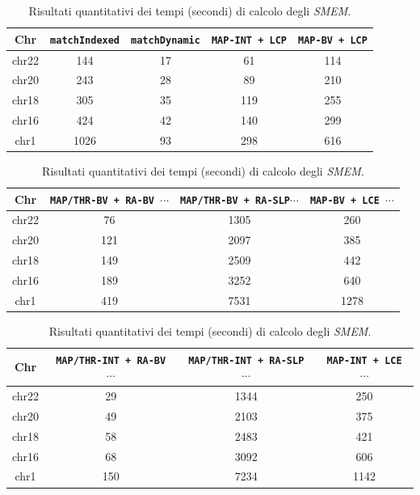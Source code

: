  

\begin{table}
  \centering
  \caption{Risultati quantitativi dei tempi (secondi) di calcolo degli
    \textit{SMEM}.}  
  \label{tab:exetime}
  \footnotesize
  \begin{tabular}{c||c|c|c|c} 
    \textbf{Chr}
    & \textbf{\texttt{matchIndexed}}
    & \textbf{\texttt{matchDynamic}}
    & \textbf{\texttt{MAP-INT \newline+ LCP}}
    & \textbf{\texttt{MAP-BV \newline+ LCP}}\\
    \hline
    \hline
    chr22 & 144 & 17 & 61 & 114 \\
    chr20 & 243 & 28 & 89 & 210 \\
    chr18 & 305 & 35 & 119 & 255 \\
    chr16 & 424 & 42 & 140 & 299 \\
    chr1 & 1026 & 93 & 298 & 616
  \end{tabular}
  \vspace{+3mm}
  \vspace{+1mm}
  \begin{tabular}{c||c|c|c} 
    \textbf{Chr}
    & \textbf{\texttt{MAP/THR-BV + RA-BV $\cdots$}}
    & \textbf{\texttt{MAP/THR-BV + RA-SLP$\cdots$}}
    & \textbf{\texttt{MAP-BV + LCE $\cdots$}}\\
    \hline
    \hline
    chr22 & 76 & 1305 & 260 \\
    chr20 & 121 & 2097 & 385  \\
    chr18 & 149 & 2509 & 442  \\
    chr16 & 189 & 3252 & 640 \\
    chr1 & 419 & 7531 & 1278 
  \end{tabular}
  \vspace{+3mm}
  \vspace{+1mm}
  \begin{tabular}{c||c|c|c} 
    \textbf{Chr}
    & \textbf{\texttt{MAP/THR-INT + RA-BV $\cdots$}}
    & \textbf{\texttt{MAP/THR-INT + RA-SLP $\cdots$}}
    & \textbf{\texttt{MAP-INT + LCE $\cdots$}}\\
    \hline
    \hline
    chr22 & 29 & 1344 & 250 \\
    chr20 & 49 & 2103 & 375 \\
    chr18 & 58 & 2483 & 421 \\
    chr16 & 68 & 3092 & 606 \\
    chr1 & 150 & 7234 & 1142

  \end{tabular}
\end{table}


